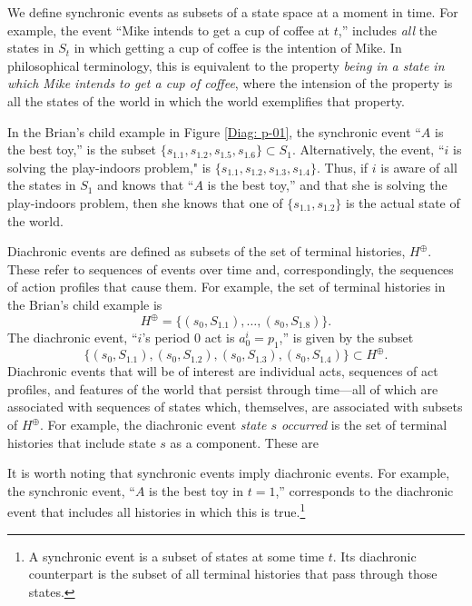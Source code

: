 \documentclass[
11pt,
titlepage,
reqno,
]{article}%
\theoremstyle{definition}
\begin{document}
We define synchronic events as subsets of a state space at a moment in time. 
For example, the event ``Mike intends to get a cup of coffee at $t$,'' includes \textit{all} the states in $S_t$ in which getting a cup of coffee is the intention of Mike. 
In philosophical terminology, this is equivalent to the property \textit{being in a state in which Mike intends to get a cup of coffee}, where the intension of the property is all the states of the world in which the world exemplifies that property.

In the Brian's child example in Figure \ref{Diag: p-01}, the synchronic event ``$A$ is the best toy,'' is the subset $\{s_{1.1},s_{1.2},s_{1.5},s_{1.6}\}\subset S_1$.
Alternatively, the event, ``$i$ is solving the play-indoors problem," is $\{s_{1.1},s_{1.2},s_{1.3},s_{1.4}\}$.
Thus, if $i$ is aware of all the states in $S_1$ and knows that ``$A$ is the best toy,'' and that she is solving the play-indoors problem, then she knows that one of $\{s_{1.1},s_{1.2}\}$ is the actual state of the world.

Diachronic events are defined as subsets of the set of terminal histories, $H^\oplus$.
These refer to sequences of events over time and, correspondingly, the sequences of action profiles that cause them.
For example, the set of terminal histories in the Brian's child example is
\[
	H^\oplus=\{(s_0,S_{1.1}),\ldots,(s_0,S_{1.8})\}.
\]
The diachronic event, ``$i$'s period 0 act is $a^i_0=p_1$,'' is given by the subset
\[
	\{(s_0,S_{1.1}),(s_0,S_{1.2}),(s_0,S_{1.3}),(s_0,S_{1.4})\}\subset H^\oplus.
\] 
Diachronic events that will be of interest are individual acts, sequences of act profiles, and features of the world that persist through time---all of which are associated with sequences of states which, themselves, are associated with subsets of $H^\oplus$.
For example, the diachronic event \textit{state $s$ occurred} is the set of terminal histories that include state $s$ as a component.
These are 

It is worth noting that synchronic events imply diachronic events.
For example, the synchronic event, ``$A$ is the best toy in $t=1$,'' corresponds to the diachronic event that includes all histories in which this is true.\footnote
{
	A synchronic event is a subset of states at some time $t$. Its diachronic counterpart is the subset of all terminal histories that pass through those states.
}


	
\end{document}
